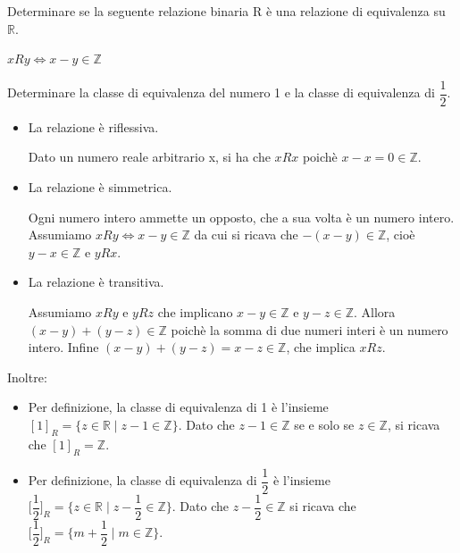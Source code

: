 \begin{esercizio}
    Determinare se la seguente relazione binaria R è una relazione di equivalenza su $\mathbb{R}$.
	
	\begin{center}
		$xRy \Leftrightarrow x-y \in \mathbb{Z}$
	\end{center}

	Determinare la classe di equivalenza del numero 1 e la classe di equivalenza di $\dfrac{1}{2}$.

\end{esercizio}
\begin{soluzione}
    \begin{itemize}\setlength\itemsep{1em}

	\item La relazione è riflessiva.
	
	Dato un numero reale arbitrario x, si ha che $xRx$ poichè $x-x = 0 \in \mathbb{Z}$.
	
	\item La relazione è simmetrica.

	Ogni numero intero ammette un opposto, che a sua volta è un numero intero. Assumiamo $xRy \Leftrightarrow x-y \in \mathbb{Z}$ da cui si ricava che $-(x-y)\in \mathbb{Z}$, cioè $y-x \in \mathbb{Z}$ e $yRx$. 
	
	\item La relazione è transitiva. 
	
	Assumiamo $xRy$ e $yRz$ che implicano $x-y \in \mathbb{Z}$ e $y-z \in \mathbb{Z}$. Allora $(x-y)+(y-z) \in \mathbb{Z}$ poichè la somma  di due numeri interi è un numero intero. Infine $(x-y)+(y-z) = x-z \in \mathbb{Z}$, che implica $xRz$.
\end{itemize}

Inoltre:

\begin{itemize}\setlength\itemsep{1em}
	\item[*] Per definizione, la classe di equivalenza di 1 è l'insieme $[1]_R = \{ z \in \mathbb{R} \mid  z-1 \in \mathbb{Z} \}$. Dato che $z-1 \in \mathbb{Z}$ se e solo se $z \in \mathbb{Z}$, si ricava che $[1]_R = \mathbb{Z}$. 
	
	\item[*] Per definizione, la classe di equivalenza di $\dfrac{1}{2}$ è l'insieme $\bigg[\dfrac{1}{2}\bigg]_R = \bigg\{ z \in \mathbb{R} \mid z - \dfrac{1}{2} \in \mathbb{Z}  \bigg\}$. Dato che $z-\dfrac{1}{2}\in \mathbb{Z}$ si ricava che $\bigg[\dfrac{1}{2}\bigg]_R = \bigg\{ m + \dfrac{1}{2} \mid  m \in \mathbb{Z} \bigg\}$.
\end{itemize}

\end{soluzione}




